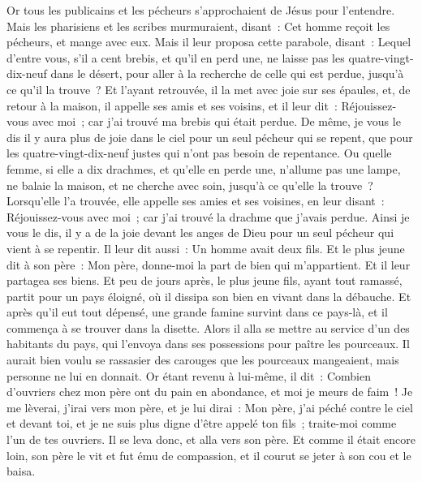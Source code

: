 \begin{multicols}{2}
\VerseOne{}Or tous les publicains et les pécheurs s'approchaient de Jésus pour l'entendre.
Mais les pharisiens et les scribes murmuraient, disant~: Cet homme reçoit les pécheurs, et mange avec eux.
Mais il leur proposa cette parabole, disant~:
Lequel d'entre vous, s'il a cent brebis, et qu'il en perd une, ne laisse pas les quatre-vingt-dix-neuf dans le désert, pour aller à la recherche de celle qui est perdue, jusqu'à ce qu'il la trouve~?
Et l'ayant retrouvée, il la met avec joie sur ses épaules,
et, de retour à la maison, il appelle ses amis et ses voisins, et il leur dit~: Réjouissez-vous avec moi~; car j'ai trouvé ma brebis qui était perdue.
De même, je vous le dis il y aura plus de joie dans le ciel pour un seul pécheur qui se repent, que pour les quatre-vingt-dix-neuf justes qui n'ont pas besoin de repentance.
Ou quelle femme, si elle a dix drachmes, et qu'elle en perde une, n'allume pas une lampe, ne balaie la maison, et ne cherche avec soin, jusqu'à ce qu'elle la trouve~?
Lorsqu'elle l'a trouvée, elle appelle ses amies et ses voisines, en leur disant~: Réjouissez-vous avec moi~; car j'ai trouvé la drachme que j'avais perdue.
Ainsi je vous le dis, il y a de la joie devant les anges de Dieu pour un seul pécheur qui vient à se repentir.
Il leur dit aussi~: Un homme avait deux fils.
Et le plus jeune dit à son père~: Mon père, donne-moi la part de bien qui m'appartient. Et il leur partagea ses biens.
Et peu de jours après, le plus jeune fils, ayant tout ramassé, partit pour un pays éloigné, où il dissipa son bien en vivant dans la débauche.
Et après qu'il eut tout dépensé, une grande famine survint dans ce pays-là, et il commença à se trouver dans la disette.
Alors il alla se mettre au service d'un des habitants du pays, qui l'envoya dans ses possessions pour paître les pourceaux.
Il aurait bien voulu se rassasier des carouges que les pourceaux mangeaient, mais personne ne lui en donnait.
Or étant revenu à lui-même, il dit~: Combien d'ouvriers chez mon père ont du pain en abondance, et moi je meurs de faim~!
Je me lèverai, j'irai vers mon père, et je lui dirai~: Mon père, j'ai péché contre le ciel et devant toi,
et je ne suis plus digne d'être appelé ton fils~; traite-moi comme l'un de tes ouvriers.
Il se leva donc, et alla vers son père. Et comme il était encore loin, son père le vit et fut ému de compassion, et il courut se jeter à son cou et le baisa.

\end{multicols}
